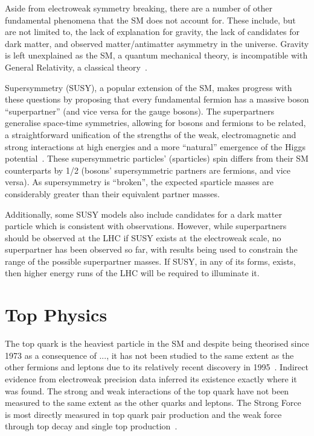 Aside from electroweak symmetry breaking, there are a number of other fundamental phenomena that the SM does not account for. 
These include, but are not limited to, the lack of explanation for gravity, the lack of candidates for dark matter, and observed matter/antimatter asymmetry in the universe. 
Gravity is left unexplained as the SM, a quantum mechanical theory, is incompatible with General Relativity, a classical theory~\cite{Khalil:2003vd}. 

Supersymmetry (SUSY), a popular extension of the SM, makes progress with these questions by proposing that every fundamental fermion has a massive boson ``superpartner'' (and vice versa for the gauge bosons). 
The superpartners generalise space-time symmetries, allowing for bosons and fermions to be related, a straightforward unification of the strengths of the weak, electromagnetic and strong interactions at high energies and a more ``natural'' emergence of the Higgs potential~\cite{Khalil:2003vd}. 
These supersymmetric particles' (sparticles) spin differs from their SM counterparts by 1/2 (\ie bosons' supersymmetric partners are fermions, and vice versa). 
As supersymmetry is ``broken'', the expected sparticle masses are considerably greater than their equivalent partner masses. 

Additionally, some SUSY models also include candidates for a dark matter particle which is consistent with observations. 
However, while superpartners should be observed at the LHC if SUSY exists at the electroweak scale, no superpartner has been observed so far, with results being used to constrain the range of the possible superpartner masses. 
If SUSY, in any of its forms, exists, then higher energy runs of the LHC will be required to illuminate it.

\section{Top Physics}\label{sec:top-physics}
The top quark is the heaviest particle in the SM and despite being theorised since 1973 as a consequence of ..., it has not been studied to the same extent as the other fermions and leptons due to its relatively recent discovery in 1995~\cite{Quadt}. 
Indirect evidence from electroweak precision data inferred its existence exactly where it was found. 
The strong and weak interactions of the top quark have not been measured to the same extent as the other quarks and leptons.
The Strong Force is most directly measured in top quark pair production and the weak force through top decay and single top production~\cite{Quadt}. 

